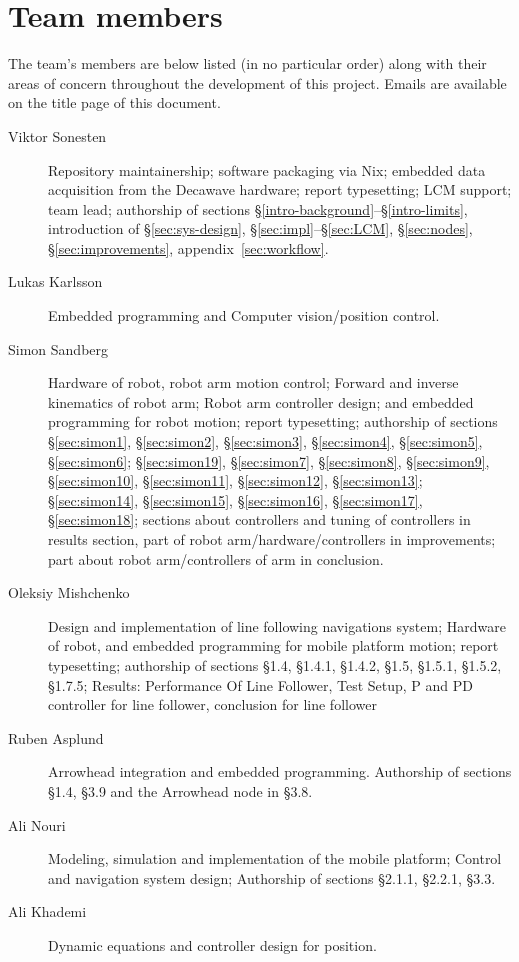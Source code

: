 \section{Team members}
The team's members are below listed (in no particular order) along with their areas of concern throughout the development of this project.
Emails are available on the title page of this document.

\begin{description}
\item[Viktor Sonesten] Repository maintainership; software packaging via
  Nix; embedded data acquisition from the Decawave hardware; report
  typesetting; LCM support; team lead; authorship of sections
  §\ref{intro-background}--§\ref{intro-limits}, introduction of
  §\ref{sec:sys-design}, §\ref{sec:impl}--§\ref{sec:LCM},
  §\ref{sec:nodes}, §\ref{sec:improvements},
  appendix~\ref{sec:workflow}.

    \item[Lukas Karlsson]
    Embedded programming and
    Computer vision/position control.

    \item[Simon Sandberg]
    Hardware of robot, robot arm motion control;
    Forward and inverse kinematics of robot arm;
    Robot arm controller design;
    and embedded programming for robot motion; report
    typesetting; authorship of sections §\ref{sec:simon1}, §\ref{sec:simon2}, §\ref{sec:simon3}, §\ref{sec:simon4}, §\ref{sec:simon5}, §\ref{sec:simon6};
    §\ref{sec:simon19}, §\ref{sec:simon7}, §\ref{sec:simon8}, §\ref{sec:simon9}, §\ref{sec:simon10}, §\ref{sec:simon11}, §\ref{sec:simon12}, §\ref{sec:simon13};
    §\ref{sec:simon14}, §\ref{sec:simon15}, §\ref{sec:simon16}, §\ref{sec:simon17}, §\ref{sec:simon18};
    sections about controllers and tuning of controllers in results section, part of robot arm/hardware/controllers in improvements;
    part about robot arm/controllers of arm in conclusion.

    \item[Oleksiy Mishchenko]
    Design and implementation of line following navigations system;
    Hardware of robot, and embedded programming for mobile platform motion; report
     typesetting; authorship of sections §1.4, §1.4.1, §1.4.2, §1.5, §1.5.1, §1.5.2, §1.7.5;
     Results: Performance Of Line Follower, Test Setup, P and PD controller for line follower, conclusion for line follower

    \item[Ruben Asplund]
    Arrowhead integration and embedded programming.
    Authorship of sections §1.4, §3.9 and the Arrowhead node in §3.8.

    \item[Ali Nouri]
    Modeling, simulation and implementation of the mobile platform;
    Control and navigation system design;
    Authorship of sections §2.1.1, §2.2.1, §3.3.

    \item[Ali Khademi]
    Dynamic equations and controller design for position.
\end{description}
